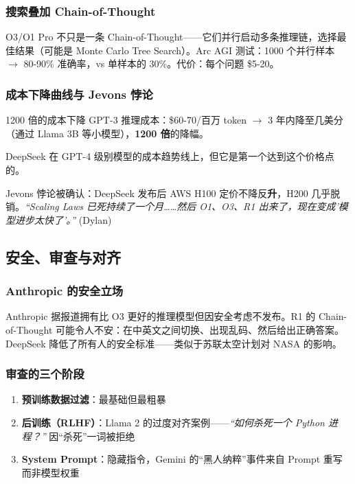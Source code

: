 \documentclass[a4paper]{article}
\begin{document}
\subsubsection{搜索叠加 Chain-of-Thought}

O3/O1 Pro 不只是一条 Chain-of-Thought——它们并行启动多条推理链，选择最佳结果（可能是 Monte Carlo Tree Search）。Arc AGI 测试：1000 个并行样本 $\to$ 80-90\% 准确率，vs 单样本的 30\%。代价：每个问题 \$5-20。

\subsubsection{成本下降曲线与 Jevons 悖论}

\begin{importantbox}{1200 倍的成本下降}
GPT-3 推理成本：\$60-70/百万 token $\to$ 3 年内降至几美分（通过 Llama 3B 等小模型），\textbf{1200 倍}的降幅。

DeepSeek 在 GPT-4 级别模型的成本趋势线上，但它是第一个达到这个价格点的。

Jevons 悖论被确认：DeepSeek 发布后 AWS H100 定价不降反\textbf{升}，H200 几乎脱销。\textit{``Scaling Laws 已死持续了一个月……然后 O1、O3、R1 出来了，现在变成'模型进步太快了'。''} (Dylan)
\end{importantbox}

\subsection{安全、审查与对齐}

\subsubsection{Anthropic 的安全立场}

Anthropic 据报道拥有比 O3 更好的推理模型但因安全考虑不发布。R1 的 Chain-of-Thought 可能令人不安：在中英文之间切换、出现乱码、然后给出正确答案。DeepSeek 降低了所有人的安全标准——类似于苏联太空计划对 NASA 的影响。

\subsubsection{审查的三个阶段}

\begin{enumerate}
    \item \textbf{预训练数据过滤}：最基础但最粗暴
    \item \textbf{后训练（RLHF）}：Llama 2 的过度对齐案例——\textit{``如何杀死一个 Python 进程？''} 因``杀死''一词被拒绝
    \item \textbf{System Prompt}：隐藏指令，Gemini 的``黑人纳粹''事件来自 Prompt 重写而非模型权重
\end{enumerate}
\end{document}
